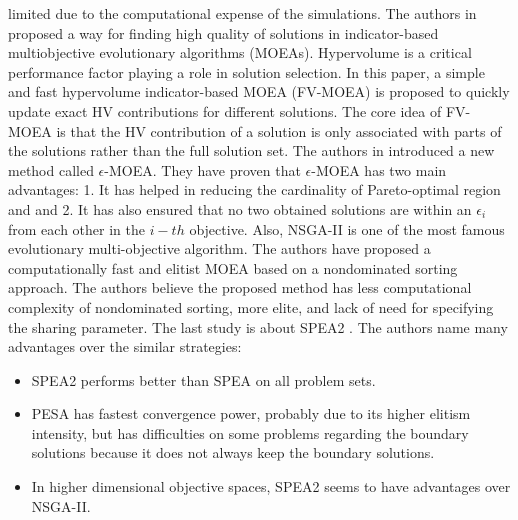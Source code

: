 limited due to the computational expense of the simulations.
The authors in \cite{jiang2015simple} proposed a way for finding high quality of solutions in indicator-based multiobjective evolutionary algorithms (MOEAs). Hypervolume is a critical performance factor playing a role in solution selection. In this paper, a simple and fast hypervolume indicator-based MOEA (FV-MOEA) is proposed to quickly update exact HV contributions for different solutions. The core idea of FV-MOEA is that the HV
contribution of a solution is only associated with parts of the solutions rather than the full solution set.
The authors in \cite{jiang2015simple} introduced a new method called $\epsilon$-MOEA. They have proven that $\epsilon$-MOEA has two main advantages: 1. It has helped in reducing the cardinality of Pareto-optimal region and and 2. It has also ensured that no two obtained solutions are within an $\epsilon_i$ from each other in the $i-th$ objective.
Also, NSGA-II \cite{deb2002fast} is one of the most famous evolutionary multi-objective algorithm. The authors have proposed a computationally fast and elitist MOEA based on a nondominated sorting approach. The authors believe the proposed method has less computational complexity of nondominated sorting, more elite, and lack of need for specifying the sharing parameter.
The last study is about SPEA2 \cite{zitzler2001spea2}. The authors name many advantages over the similar strategies:
\begin{itemize}
\item SPEA2 performs better than SPEA on all problem sets.
\item PESA has fastest convergence power, probably due to its higher elitism intensity, but has difficulties on some problems regarding the boundary solutions because it does not always keep the boundary solutions.
\item In higher dimensional objective spaces, SPEA2 seems to have advantages over NSGA-II.
\end{itemize}

